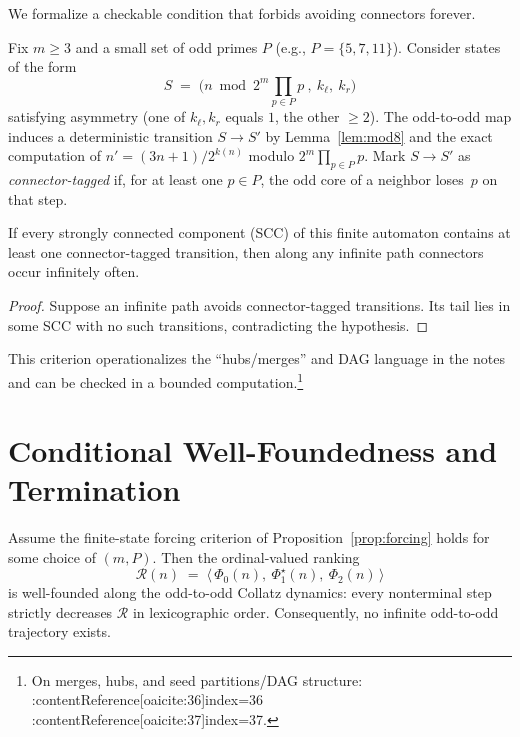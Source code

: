 \documentclass[11pt]{article}
\begin{document}
We formalize a checkable condition that forbids avoiding connectors forever.

\begin{defn}
Fix $m\ge 3$ and a small set of odd primes $P$ (e.g., $P=\{5,7,11\}$).
Consider states of the form
\[
  S\;=\;\Big(n\bmod 2^m\!\!\!\prod_{p\in P}\!p\ ,\ k_\ell,\ k_r\Big)
\]
satisfying asymmetry (one of $k_\ell,k_r$ equals $1$, the other $\ge 2$).
The odd-to-odd map induces a deterministic transition $S\to S'$ by Lemma~\ref{lem:mod8}
and the exact computation of $n'=(3n+1)/2^{k(n)}$ modulo $2^m\prod_{p\in P}p$.
Mark $S\to S'$ as \emph{connector-tagged} if, for at least one $p\in P$, the odd core of a neighbor loses~$p$ on that step.
\end{defn}

\begin{prop}\label{prop:forcing}
If every strongly connected component (SCC) of this finite automaton contains at least one connector-tagged transition, then along any infinite path connectors occur infinitely often.
\end{prop}

\begin{proof}
Suppose an infinite path avoids connector-tagged transitions. Its tail lies in some SCC with no such transitions, contradicting the hypothesis.
\end{proof}

This criterion operationalizes the ``hubs/merges'' and DAG language in the notes and can be checked in a bounded computation.\footnote{On merges, hubs, and seed partitions/DAG structure: :contentReference[oaicite:36]{index=36} :contentReference[oaicite:37]{index=37}.}

\section{Conditional Well-Foundedness and Termination}

\begin{thm}\label{thm:main}
Assume the finite-state forcing criterion of Proposition~\ref{prop:forcing} holds for some choice of $(m,P)$.
Then the ordinal-valued ranking
\[
  \mathcal{R}(n)\;=\;\big\langle\,\Phi_0(n),\ \Phi_1^\star(n),\ \Phi_2(n)\,\big\rangle
\]
is well-founded along the odd-to-odd Collatz dynamics: every nonterminal step strictly decreases $\mathcal{R}$ in lexicographic order. Consequently, no infinite odd-to-odd trajectory exists.
\end{thm}
\end{document}
